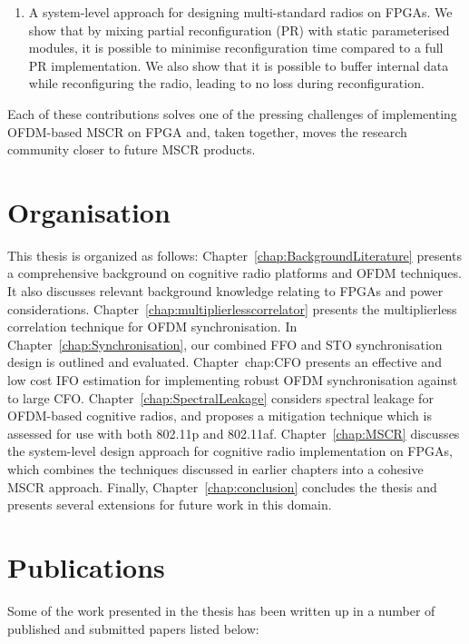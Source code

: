 \begin{enumerate}
\item A system-level approach for designing multi-standard radios on FPGAs.
We show that by mixing partial reconfiguration (PR) with static parameterised modules, it is possible to minimise reconfiguration time compared to a full PR implementation.
We also show that it is possible to buffer internal data while reconfiguring the radio, leading to no loss during reconfiguration.%
\end{enumerate}

Each of these contributions solves one of the pressing challenges of implementing OFDM-based MSCR on FPGA and, taken together, moves the research community closer to future MSCR products.

\section{Organisation}

This thesis is organized as follows:
Chapter~\ref{chap:BackgroundLiterature} presents a comprehensive background on cognitive radio platforms and OFDM techniques. It also discusses relevant background knowledge relating to FPGAs and power considerations. Chapter~\ref{chap:multiplierlesscorrelator} presents the multiplierless correlation technique for OFDM synchronisation. In Chapter~\ref{chap:Synchronisation}, our combined FFO and STO synchronisation design is outlined and evaluated. Chapter~{chap:CFO} presents an effective and low cost IFO estimation for implementing robust OFDM synchronisation against to large CFO. Chapter~\ref{chap:SpectralLeakage} considers  spectral leakage for OFDM-based cognitive radios, and proposes a mitigation technique which is assessed for use with both 802.11p and 802.11af.
Chapter~\ref{chap:MSCR} discusses the system-level design approach for cognitive radio implementation on FPGAs, which combines the techniques discussed in earlier chapters into a cohesive MSCR approach.
Finally, Chapter~\ref{chap:conclusion} concludes the thesis and presents several extensions for future work in this domain.

\section{Publications}
Some of the work presented in the thesis has been written up in a number of published and submitted papers listed below:


